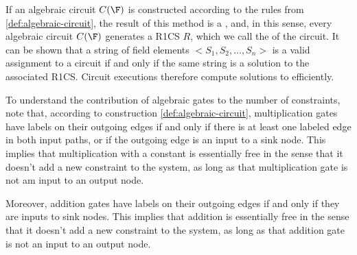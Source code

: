 If an algebraic circuit $C(\F)$ is constructed according to the rules from \ref{def:algebraic-circuit}, the result of this method is a , and, in this sense, every algebraic circuit $C(\F)$ generates a R1CS $R$, which we call the  of the circuit. It can be shown that a string of field elements $<S_1,S_2,\ldots, S_n>$ is a valid assignment to a circuit if and only if the same string is a solution to the associated R1CS. Circuit executions therefore compute solutions to  efficiently. 

To understand the contribution of algebraic gates to the number of constraints, note that,
according to construction \ref{def:algebraic-circuit}, multiplication gates have labels on their outgoing edges if and only if there is at least one labeled edge in both input paths, or if the outgoing edge is an input to a sink node. This implies that multiplication with a constant is essentially free in the sense that it doesn't add a new constraint to the system, as long as that multiplication gate is not am input to an output node. 

Moreover, addition gates have labels on their outgoing edges if and only if they are inputs to sink nodes. This implies that addition is essentially free in the sense that it doesn't add a new constraint to the system, as long as that addition gate is not an input to an output node. 

